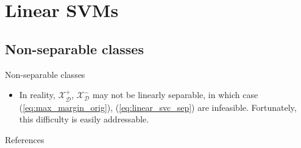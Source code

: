 \documentclass{beamer}
\numberwithin{equation}{section}
\newcommand{\aref}[1]{\alert{\ref{#1}}}
\begin{document}
\section{Linear SVMs}

\subsection{Non-separable classes}

\begin{frame}{Non-separable classes}
    \begin{itemize}
        \item
        In reality, $ \mathcal{X}_\mathcal{D}^+ $,
        $ \mathcal{X}_\mathcal{D}^- $ may not be linearly separable, in which
        case (\aref{eq:max_margin_orig}), (\aref{eq:linear_svc_sep}) are
        infeasible. Fortunately, this difficulty is easily addressable.
    \end{itemize}
\end{frame}

%
%

\begin{frame}{References}
    
    
\end{frame}
\end{document}
